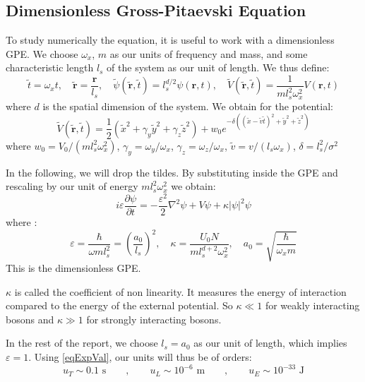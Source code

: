 \documentclass{article}
\begin{document}
\subsection{Dimensionless Gross-Pitaevski Equation}
To study numerically the equation, it is useful to work with a dimensionless GPE. We choose $\omega_x$, $m$ as our units of frequency and mass, and some characteristic length $l_s$ of the system as our unit of length. We thus define:
\begin{equation}\label{eq:dimensionless-units}
	\tilde{t}=\omega_{x} t, \quad \tilde{\mathbf{r}}=\frac{\mathbf{r}}{l_s}, \quad \tilde{\psi}(\tilde{\mathbf{r}}, \tilde{t})=l_s^{d / 2} \psi(\mathbf{r}, t), \quad
	\tilde{V}(\tilde{\mathbf{r}}, \tilde{t}) =\frac{1}{m l_s^2 \omega_x^2} V(\mathbf{r}, t)
\end{equation}
where $d$ is the spatial dimension of the system. We obtain for the potential:
$$
\tilde{V}(\tilde{\mathbf{r}}, \tilde{t}) =\frac{1}{2}(\tilde{x}^2+\gamma_y \tilde{y}^2+\gamma_z \tilde{z}^2)+w_0 e^{-\delta\left((\tilde{x}-\tilde{v} \tilde{t})^2+\tilde{y}^2+\tilde{z}^2\right)}
$$
where $w_0=V_0/(m l_s^2 \omega_x^2)$, $\gamma_y=\omega_y/\omega_x$, $\gamma_z=\omega_z/\omega_x$, $\tilde{v}=v/(l_s \omega_x)$, $\delta=l_s^2/\sigma^2$

\bigskip \noindent
In the following, we will drop the tildes. By substituting inside the GPE and rescaling by our unit of energy $m l_s^2 \omega_x^2$ we obtain:
\begin{equation}\label{eqDGPE}
    \boxed{i \varepsilon \frac{\partial \psi}{\partial t}=-\frac{\varepsilon^{2}}{2} \nabla^{2} \psi+V \psi+\kappa|\psi|^{2} \psi}
\end{equation}
where :
$$
\varepsilon=\frac{\hbar}{\omega m l_s^{2}}=\left(\frac{a_{0}}{l_s}\right)^{2}, \quad \kappa=\frac{U_0 N}{m l_s^{d+2} \omega^2_x}, \quad a_{0}=\sqrt{\frac{\hbar}{\omega_{x} m}}
$$
This is the dimensionless GPE.

\bigskip
$\kappa$ is called the coefficient of non linearity. It measures the energy of interaction compared to the energy of the external potential. So $\kappa\ll 1$ for weakly interacting bosons and $\kappa\gg 1$ for strongly interacting bosons.

\bigskip
In the rest of the report, we choose $l_s=a_0$ as our unit of length, which implies $\varepsilon=1$. Using \eqref{eqExpVal}, our units will thus be of orders:
$$
u_T\sim0.1\text{ s}\qquad,\qquad u_L\sim10^{-6}\text{ m}\qquad,\qquad u_E\sim10^{-33}\text{ J}
$$
\end{document}
